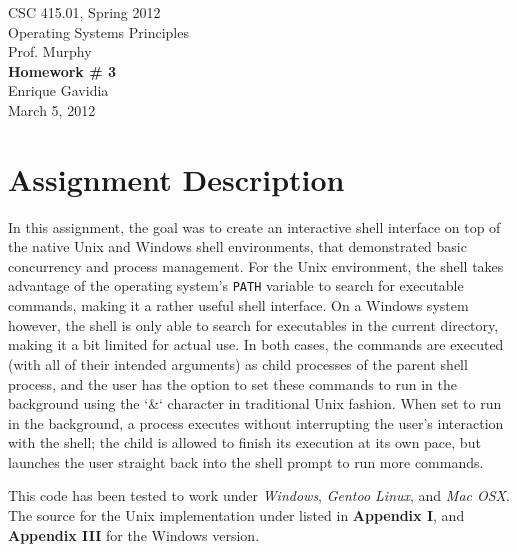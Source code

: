 \documentclass[12pt]{article}
\def \name       {Enrique Gavidia}
\def \coursenum  {CSC 415.01}
\def \coursename {Operating Systems Principles}
\def \instructor {Prof. Murphy}
\def \semester   {Spring 2012}
\def \assignment {Homework \# 3}
\def \duedate    {March 5, 2012}
\newcommand {\makecover} {
  \begin{titlepage}
    \begin{center}
      \LARGE{\coursenum, \semester \\ \coursename}\\
      \Large{\instructor}\\
      \vfill
      \textbf{\Huge \assignment}\\
      \vfill
      \Large{\name}\\ 
      \large{\duedate}
    \end{center}
  \end{titlepage}
}
\begin{document}
\makecover

\section*{Assignment Description}
In this assignment, the goal was to create an interactive shell interface on top of the native Unix and Windows shell environments, that
demonstrated basic concurrency and process management. For the Unix environment, the shell takes advantage of the operating system's 
\texttt{PATH} variable to search for executable commands, making it a rather useful shell interface. On a Windows system however, the shell 
is only able to search for executables in the current directory, making it a bit limited for actual use. In both cases, the commands are 
executed (with all of their intended arguments) as child processes of the parent shell process, and the user has the option to set these commands 
to run in the background using the `\&` character in traditional Unix fashion. When set to run in the background, a process executes without 
interrupting the user's interaction with the shell; the child is allowed to finish its execution at its own pace, but launches the user straight 
back into the shell prompt to run more commands. 

This code has been tested to work under \textsl{Windows}, \textsl{Gentoo Linux}, and \textsl{Mac OSX}. 
The source for the Unix implementation under listed in \textbf{Appendix I}, and \textbf{Appendix III} for the Windows version.
\end{document}

